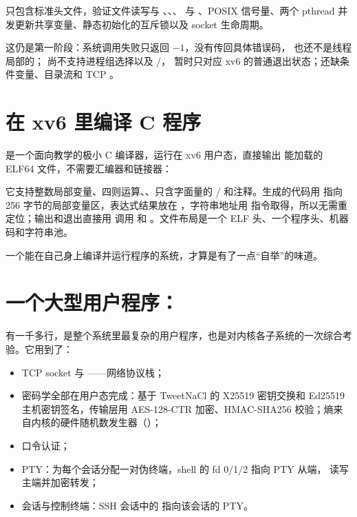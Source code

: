  只包含标准头文件，验证文件读写与 、、、 与 、POSIX 信号量、两个 pthread 并发更新共享变量、静态初始化的互斥锁以及 socket 生命周期。

这仍是第一阶段：系统调用失败只返回 $-1$，没有传回具体错误码， 也还不是线程局部的； 尚不支持进程组选择以及 /， 暂时只对应 xv6 的普通退出状态；还缺条件变量、目录流和 TCP 。

\section{在 xv6 里编译 C 程序}

 是一个面向教学的极小 C 编译器，运行在 xv6 用户态，直接输出  能加载的 ELF64 文件，不需要汇编器和链接器：


它支持整数局部变量、四则运算、、只含字面量的 / 和注释。生成的代码用  指向 256 字节的局部变量区，表达式结果放在 ，字符串地址用  指令取得，所以无需重定位；输出和退出直接用  调用  和 。文件布局是一个 ELF 头、一个程序头、机器码和字符串池。

一个能在自己身上编译并运行程序的系统，才算是有了一点“自举”的味道。

\section{一个大型用户程序：}

 有一千多行，是整个系统里最复杂的用户程序，也是对内核各子系统的一次综合考验。它用到了：

\begin{itemize}
  \item TCP socket 与 ——网络协议栈；
  \item 密码学全部在用户态完成：基于 TweetNaCl\cite{tweetnacl} 的 X25519 密钥交换和 Ed25519 主机密钥签名，传输层用 AES-128-CTR 加密、HMAC-SHA256 校验；熵来自内核的硬件随机数发生器（）；
  \item {} 口令认证；
  \item PTY：为每个会话分配一对伪终端，shell 的 fd 0/1/2 指向 PTY 从端， 读写主端并加密转发；
  \item 会话与控制终端：SSH 会话中的  指向该会话的 PTY。
\end{itemize}

